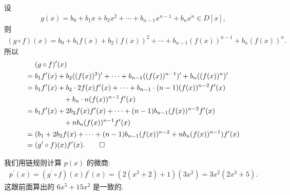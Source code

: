 \begin{pf}
    设
    \begin{align*}
        g(x) = b_0 + b_1 x + b_2 x^2 + \cdots + b_{n-1} x^{n-1} + b_n x^n \in D[x],
    \end{align*}
    则
    \begin{align*}
        (g \circ f) (x) = b_0 + b_1 f(x) + b_2 (f(x))^2 + \cdots + b_{n-1} (f(x))^{n-1} + b_n (f(x))^n.
    \end{align*}
    所以
    \begin{align*}
             & (g \circ f)^{\prime} (x)                                \\
        = {} & b_1 f^{\prime} (x) + b_2 ((f(x))^2)^{\prime} + \cdots
        + b_{n-1} ((f(x))^{n-1})^{\prime} + b_n ((f(x))^n)^{\prime}    \\
        = {} & b_1 f^{\prime} (x) + b_2 \cdot 2 f(x) f^{\prime} (x)
        + \cdots + b_{n-1} \cdot (n-1) (f(x))^{n-2} f^{\prime} (x)     \\
             & \qquad \qquad + b_n \cdot n (f(x))^{n-1} f^{\prime} (x) \\
        = {} & b_1 f^{\prime} (x) + 2b_2 f(x) f^{\prime} (x)
        + \cdots + (n-1) b_{n-1} (f(x))^{n-2} f^{\prime} (x)           \\
             & \qquad \qquad + n b_n (f(x))^{n-1} f^{\prime} (x)       \\
        = {} & (b_1 + 2b_2 f(x) + \cdots + (n-1) b_{n-1} (f(x))^{n-2}
        + n b_n (f(x))^{n-1}) f^{\prime} (x)                           \\
        = {} & (g^{\prime} \circ f) (x) f^{\prime} (x). \qedhere
    \end{align*}
\end{pf}

\begin{example}
    我们用链规则计算 $p(x)$ 的微商:
    \begin{align*}
        p^{\prime} (x) = (g^{\prime} \circ f)(x) f^{\prime} (x) = (2(x^3+2) + 1)(3x^2) = 3x^2(2x^3 + 5).
    \end{align*}
    这跟前面算出的 $6x^5 + 15x^2$ 是一致的.
\end{example}
